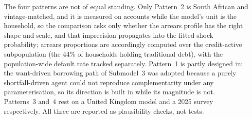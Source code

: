 \label{sec:lim-validation}
The four patterns are not of equal standing.
Only Pattern~2 is South African and vintage-matched, and it is measured on accounts while the model's unit is the household, so the comparison asks only whether the arrears profile has the right shape and scale, and that imprecision propagates into the fitted shock probability; arrears proportions are accordingly computed over the credit-active subpopulation (the 44\% of households holding traditional debt), with the population-wide default rate tracked separately.
Pattern~1 is partly designed in: the want-driven borrowing path of Submodel~3 was adopted because a purely shortfall-driven agent could not reproduce complementarity under any parameterisation, so its direction is built in while its magnitude is not.
Patterns~3 and~4 rest on a United Kingdom model and a 2025 survey respectively.
All three are reported as plausibility checks, not tests.

